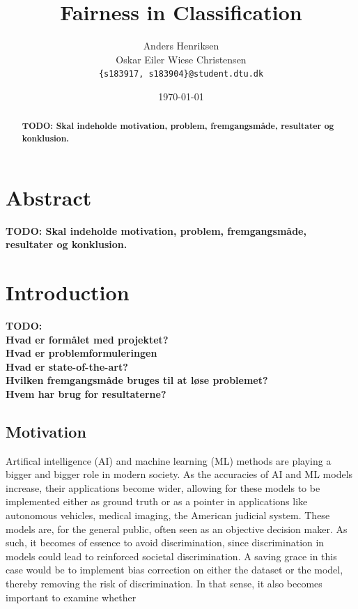 \documentclass[11pt, fleqn, titlepage]{article}
\title{Fairness in Classification}
\author{Anders Henriksen \\ Oskar Eiler Wiese Christensen  \\ \texttt{\{s183917, s183904\}@student.dtu.dk}}
\date{\today}
\begin{document}
	
	\maketitle
	\begin{abstract}
		\textbf{TODO: Skal indeholde motivation, problem, fremgangsmåde, resultater og konklusion.} \\ \lipsum[1-2]
	\end{abstract}
	\tableofcontents \newpage
	
	\section{Abstract}
	\textbf{TODO: Skal indeholde motivation, problem, fremgangsmåde, resultater og konklusion.}
	
	\section{Introduction}
	\textbf{TODO: \\ Hvad er formålet med projektet? \\ Hvad er problemformuleringen \\ Hvad er state-of-the-art? \\ Hvilken fremgangsmåde bruges til at løse problemet? \\ Hvem har brug for resultaterne?}
	
	\subsection{Motivation}
	Artifical intelligence (AI) and machine learning (ML) methods are playing a bigger and bigger role in modern society. As the accuracies of AI and ML models increase, their applications become wider, allowing for these  models to be implemented either as ground truth or as a pointer in applications like autonomous vehicles, medical imaging, the American judicial system. These models are, for the general public, often seen as an objective decision maker. As such, it becomes of essence to avoid discrimination, since discrimination in models could lead to reinforced societal discrimination. A saving grace in this case would be to implement bias correction on either the dataset or the model, thereby removing the risk of discrimination. In that sense, it also becomes important to examine whether
	
\end{document}
